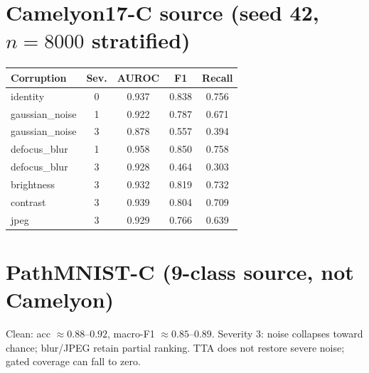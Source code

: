 \documentclass[conference]{IEEEtran}
\begin{document}
\section{Camelyon17-C source (seed 42, $n{=}8000$ stratified)}
\begin{center}
\scriptsize
\begin{tabular}{lcccc}
\toprule
Corruption & Sev. & AUROC & F1 & Recall \\
\midrule
identity & 0 & 0.937 & 0.838 & 0.756 \\
gaussian\_noise & 1 & 0.922 & 0.787 & 0.671 \\
gaussian\_noise & 3 & 0.878 & 0.557 & 0.394 \\
defocus\_blur & 1 & 0.958 & 0.850 & 0.758 \\
defocus\_blur & 3 & 0.928 & 0.464 & 0.303 \\
brightness & 3 & 0.932 & 0.819 & 0.732 \\
contrast & 3 & 0.939 & 0.804 & 0.709 \\
jpeg & 3 & 0.929 & 0.766 & 0.639 \\
\bottomrule
\end{tabular}
\end{center}

\section{PathMNIST-C (9-class source, not Camelyon)}
Clean: acc ${\approx}0.88$--$0.92$, macro-F1 ${\approx}0.85$--$0.89$.
Severity 3: noise collapses toward chance; blur/JPEG retain partial ranking.
TTA does not restore severe noise; gated coverage can fall to zero.
\end{document}
